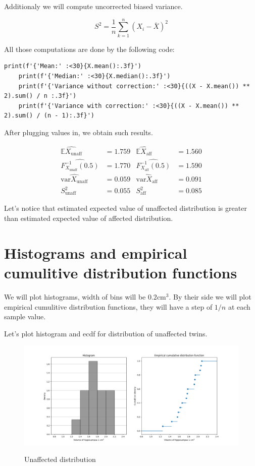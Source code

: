 \documentclass[12pt,a4paper]{article} %
\newcommand{\randv}[2][X]{#1_{\text{#2}}}
\newcommand{\E}{\mathbb{E}}
\newcommand{\var}{\text{var}}
\begin{document}
  Additionaly we will compute uncorrected biased variance.

\begin{equation*}
  S^2 = \frac{1}{n} \sum_{k = 1}^n(X_i - \bar{X})^2
\end{equation*}

  All those computations are done by the following code:

\begin{lstlisting}[basicstyle=\scriptsize]
    print(f'{'Mean:' :<30}{X.mean():.3f}')
    print(f'{'Median:' :<30}{X.median():.3f}')
    print(f'{'Variance without correction:' :<30}{((X - X.mean()) ** 2).sum() / n :.3f}')
    print(f'{'Variance with correction:' :<30}{((X - X.mean()) ** 2).sum() / (n - 1):.3f}')
\end{lstlisting}

  After plugging values in, we obtain such results.

\begin{align*}
  \widehat{\E\randv{unaff}} &= 1.759 & \widehat{\E\randv{aff}} &= 1.560 \\
  \widehat{F^{-1}_{\randv{unaff}}(0.5)} &= 1.770 & \widehat{F^{-1}_{\randv{aff}}(0.5)} &= 1.590 \\
  \widehat{\var\randv{unaff}} &= 0.059 & \widehat{\var\randv{aff}} &= 0.091 \\
  S^2_{\text{unaff}} &= 0.055 & S^2_{\text{aff}} &= 0.085
\end{align*}

Let's notice that estimated expected value of unaffected distribution is greater than estimated expected value of affected distribution.

\pagebreak
\section{Histograms and empirical cumulitive distribution functions}

We will plot histograms, width of bins will be $0.2 \text{cm}^3$. By their side we will plot empirical cumulitive distribution functions, they will have a step of $1/n$ at each sample value.

Let's plot histogram and ecdf for distribution of unaffected twins.

\begin{figure}[h]
  \centering
  \includegraphics[scale=0.4]{./img/unaffected_hist_ecdf.png}
  \label{fig:unaff_ecdf}
  \caption{Unaffected distribution}
\end{figure}
\end{document}
